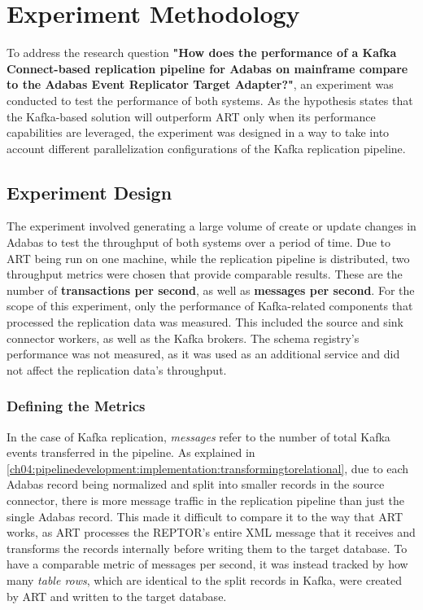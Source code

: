 \chapter{Experiment Methodology}
\label{ch05:methodology}
To address the research question \textbf{"How does the performance of a Kafka Connect-based replication pipeline for Adabas on mainframe compare to the Adabas Event Replicator Target Adapter?"}, an experiment was conducted to test the performance of both systems. As the hypothesis states that the Kafka-based solution will outperform \ac{ART} only when its performance capabilities are leveraged, the experiment was designed in a way to take into account different parallelization configurations of the Kafka replication pipeline.

\section{Experiment Design}
\label{ch05:methodology:design}
The experiment involved generating a large volume of create or update changes in Adabas to test the throughput of both systems over a period of time. Due to \ac{ART} being run on one machine, while the replication pipeline is distributed, two throughput metrics were chosen that provide comparable results. These are the number of \textbf{transactions per second}, as well as \textbf{messages per second}. For the scope of this experiment, only the performance of Kafka-related components that processed the replication data was measured. This included the source and sink connector workers, as well as the Kafka brokers. The schema registry's performance was not measured, as it was used as an additional service and did not affect the replication data's throughput.

\subsection{Defining the Metrics}
In the case of Kafka replication, \textit{messages} refer to the number of total Kafka events transferred in the pipeline. As explained in \ref{ch04:pipelinedevelopment:implementation:transformingtorelational}, due to each Adabas record being normalized and split into smaller records in the source connector, there is more message traffic in the replication pipeline than just the single Adabas record. This made it difficult to compare it to the way that \ac{ART} works, as \ac{ART} processes the \ac{REPTOR}'s entire XML message that it receives and transforms the records internally before writing them to the target database. To have a comparable metric of messages per second, it was instead tracked by how many \textit{table rows}, which are identical to the split records in Kafka, were created by \ac{ART} and written to the target database.

